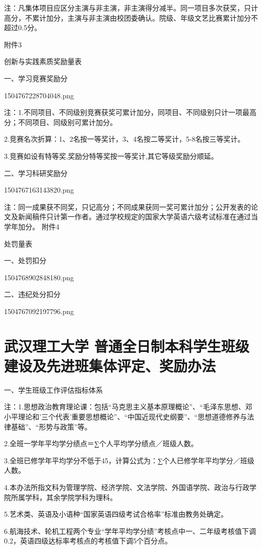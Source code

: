 \documentclass[UTF8,12pt,a4paper]{report}
\begin{document}
注：凡集体项目应区分主演与非主演，非主演得分减半。同一项目多次获奖，只计高分，不累计加分，主演与非主演由校团委确认。院级、年级文艺比赛累计加分不超过0.5分。

 

附件3

创新与实践素质奖励量表



一、学习竞赛奖励分

1504767228704048.png

注：1.不同项目、不同级别竞赛获奖可累计加分，同项目、不同级别只计一项最高分；不同项目、同级别可累计加分。

2.竞赛名次折算：1、2名按一等奖计，3、4名按二等奖计，5-8名按三等奖计。

3.竞赛如设有特等奖,奖励分特等奖按一等奖计,其它等级奖励分顺延。

二、学习科研奖励分

1504767163143820.png

注：同一成果获不同奖，只记高分；不同成果获同一奖可累计加分；公开发表的论文及新闻稿件只计第一作者。通过学校规定的国家大学英语六级考试标准在通过当学年加分。
附件4

  处罚量表



一、处罚扣分

1504768902848180.png

二、违纪处分扣分 

1504767092197796.png
\chapter{武汉理工大学 普通全日制本科学生班级 建设及先进班集体评定、奖励办法}
一、学生班级工作评估指标体系

注：1.思想政治教育理论课：包括“马克思主义基本原理概论”、“毛泽东思想、邓小平理论和'三个代表'重要思想概论”、“中国近现代史纲要”、“思想道德修养与法律基础”、“形势与政策”等。

2.全班一学年平均学分绩点＝∑个人平均学分绩点／班级人数。

3.全班已修学年平均学分不低于45，计算公式为：∑个人已修学年平均学分／班级人数。

4.本办法所指文科为管理学院、经济学院、文法学院、外国语学院、政治与行政学院所属学科，其余学院学科为理科。

5.艺术类、英语及小语种“国家英语四级考试合格率”标准由教务处确定。

6.航海技术、轮机工程两个专业“学年平均学分绩”考核点中一、二年级考核值下调0.2，英语四级达标率考核点的考核值下调5个百分点。
\end{document}
